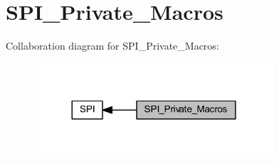 \hypertarget{group___s_p_i___private___macros}{}\section{S\+P\+I\+\_\+\+Private\+\_\+\+Macros}
\label{group___s_p_i___private___macros}
Collaboration diagram for S\+P\+I\+\_\+\+Private\+\_\+\+Macros\+:
\nopagebreak
\begin{figure}[H]
\begin{center}
\leavevmode
\includegraphics[width=252pt]{group___s_p_i___private___macros}
\end{center}
\end{figure}

